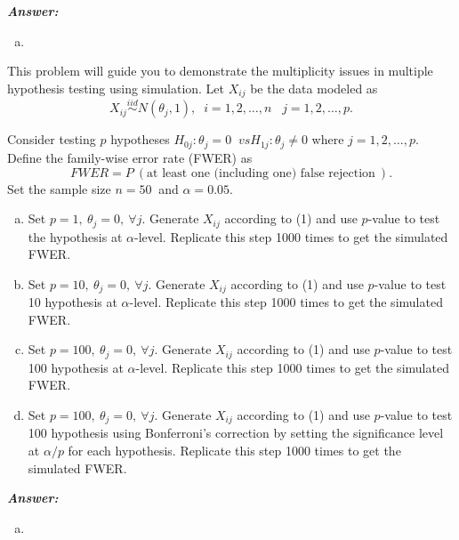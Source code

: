 \documentclass[12pt]{article}
\newenvironment{question}[2][Question]{\begin{trivlist}
\item[\hskip \labelsep {\bfseries #1}\hskip \labelsep {\bfseries #2.}]}{\end{trivlist}}
\begin{document}
  \textbf{\color{TealBlue}\emph{Answer:} } 

\begin{enumerate}[(a)]

\item 
\end{enumerate}


\bigskip
\bigskip
 \begin{question}{7.3}This problem will guide you to demonstrate the multiplicity issues in multiple hypothesis testing using simulation. Let $X_{ij}$ be the data modeled as
\begin{equation}
X_{ij} \stackrel{iid}{\sim} N( \theta_j, 1 ), \; \; i = 1, 2, \dots , n \; \; \; j = 1,2,\dots, p.
\end{equation}

Consider testing $p$ hypotheses $H_{0j} : \theta_j = 0 \; \; vs H_{1j} : \theta_j \neq 0$ where $j = 1, 2, \dots, p$. Define the family-wise error rate (FWER) as
$$
FWER = P\ ( \text{at least one (including one) false rejection} \ ).
$$
Set the sample size $n = 50\ $ and $\alpha = 0.05$.
\begin{enumerate}[(a)]
\item Set $p = 1, \ \theta_j = 0,\  \forall j$. Generate $X_{ij}$ according to (1) and use $p$-value to test the hypothesis at $\alpha$-level. Replicate this step 1000 times to get the simulated FWER.
\item  Set $p = 10, \ \theta_j = 0,\  \forall j$. Generate $X_{ij}$ according to (1) and use $p$-value to test 10 hypothesis at $\alpha$-level. Replicate this step 1000 times to get the simulated FWER.
\item  Set $p = 100, \ \theta_j = 0, \ \forall j$. Generate $X_{ij}$ according to (1) and use $p$-value to test 100 hypothesis at $\alpha$-level. Replicate this step 1000 times to get the simulated FWER.
\item  Set $p = 100, \ \theta_j = 0, \ \forall j$. Generate $X_{ij}$ according to (1) and use $p$-value to test 100 hypothesis using Bonferroni's correction by setting the significance level at $\alpha / p$ for each hypothesis.  Replicate this step 1000 times to get the simulated FWER.

\end{enumerate}

\end{question} 


  \textbf{\color{TealBlue}\emph{Answer:} } 
 
\begin{enumerate}[(a)]


\item 
\end{enumerate}
\end{document}
